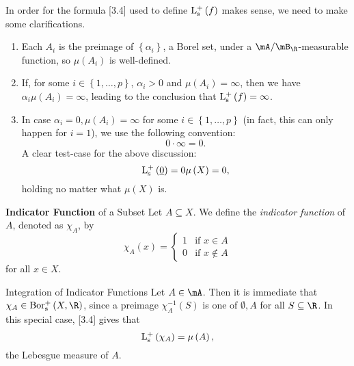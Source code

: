 \documentclass[pmath450]{subfiles}
\begin{document}
    \np In order for the formula [3.4] used to define $\operatorname{L^+_s}\left( f \right)$ makes sense, we need to make some clarifications.
    \begin{enumerate}
        \item Each $A_i$ is the preimage of $\left\lbrace \alpha_i \right\rbrace$, a Borel set, under a $\mA /\mB_{\R}$-measurable function, so $\mu\left( A_i \right)$ is well-defined.

        \item If, for some $i\in\left\lbrace 1,\ldots,p \right\rbrace$, $\alpha_i>0$ and $\mu\left( A_i \right)=\infty$, then we have $\alpha_i\mu\left( A_i \right)=\infty$, leading to the conclusion that $\operatorname{L^+_s}\left( f \right)=\infty$.

        \item In case $\alpha_i=0,\mu\left( A_i \right)=\infty$ for some $i\in\left\lbrace 1,\ldots,p \right\rbrace$ (in fact, this can only happen for $i=1$), we use the following convention:
            \begin{equation*}
                0\cdot\infty = 0.
            \end{equation*}
            A clear test-case for the above discussion:
            \begin{equation*}
                \operatorname{L^+_s}\left( \underline{0} \right) = 0\mu\left( X \right) = 0,
            \end{equation*}
            holding no matter what $\mu\left( X \right)$ is.
    \end{enumerate}

    \begin{definition}{\textbf{Indicator Function} of a Subset}
        Let $A\subseteq X$. We define the \emph{indicator function} of $A$, denoted as $\chi_A$, by
        \begin{equation*}
            \chi_A\left( x \right) =
            \begin{cases} 
                1 & \text{if $x\in A$} \\
                0 & \text{if $x\notin A$}
            \end{cases}
        \end{equation*}
        for all $x\in X$.
    \end{definition}

    \begin{example}{Integration of Indicator Functions}
        Let $A\in\mA$. Then it is immediate that $\chi_A\in\borpluss\left( X,\R \right)$, since a preimage $\chi_A^{-1}\left( S \right)$ is one of $\emptyset, A$ for all $S\subseteq\R$. In this special case, [3.4] gives that
        \begin{equation}
            \operatorname{L^+_s}\left( \chi_A \right) = \mu\left( A \right),
        \end{equation}
        the Lebesgue measure of $A$.
    \end{example}
\end{document}
